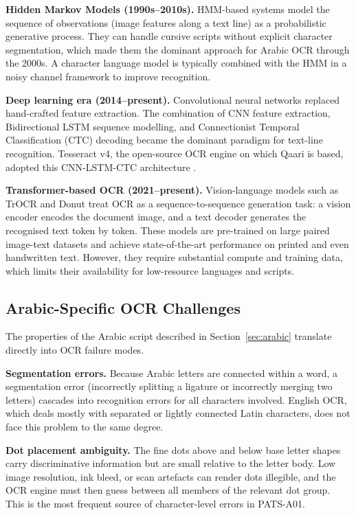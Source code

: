 \textbf{Hidden Markov Models (1990s--2010s).}
HMM-based systems model the sequence of observations (image features along a
text line) as a probabilistic generative process.
They can handle cursive scripts without explicit character segmentation, which
made them the dominant approach for Arabic OCR through the 2000s.
A character language model is typically combined with the HMM in a noisy channel
framework to improve recognition.

\textbf{Deep learning era (2014--present).}
Convolutional neural networks replaced hand-crafted feature extraction.
The combination of CNN feature extraction, Bidirectional LSTM sequence modelling,
and Connectionist Temporal Classification (CTC) decoding \cite{graves2006connectionist}
became the dominant paradigm for text-line recognition.
Tesseract v4, the open-source OCR engine on which Qaari is based, adopted this
CNN-LSTM-CTC architecture \cite{smith2007overview}.

\textbf{Transformer-based OCR (2021--present).}
Vision-language models such as TrOCR \cite{li2021trocr} and Donut
\cite{kim2022donut} treat OCR as a sequence-to-sequence generation task: a
vision encoder encodes the document image, and a text decoder generates the
recognised text token by token.
These models are pre-trained on large paired image-text datasets and achieve
state-of-the-art performance on printed and even handwritten text.
However, they require substantial compute and training data, which limits their
availability for low-resource languages and scripts.

\subsection{Arabic-Specific OCR Challenges}
\label{subsec:arabic_ocr_challenges}

The properties of the Arabic script described in Section~\ref{sec:arabic}
translate directly into OCR failure modes.

\textbf{Segmentation errors.}
Because Arabic letters are connected within a word, a segmentation error
(incorrectly splitting a ligature or incorrectly merging two letters) cascades
into recognition errors for all characters involved.
English OCR, which deals mostly with separated or lightly connected Latin
characters, does not face this problem to the same degree.

\textbf{Dot placement ambiguity.}
The fine dots above and below base letter shapes carry discriminative information
but are small relative to the letter body.
Low image resolution, ink bleed, or scan artefacts can render dots illegible,
and the OCR engine must then guess between all members of the relevant dot group.
This is the most frequent source of character-level errors in PATS-A01.

